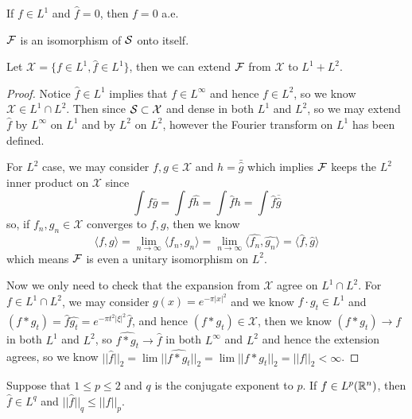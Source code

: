 \begin{corollary}
    If $f\in L^1$ and $\hat{f} = 0$, then $f=0$ a.e.
\end{corollary}

\begin{corollary}
    $\mathcal{F}$ is an isomorphism of $\mathcal{S}$ onto itself.
\end{corollary}

\begin{theorem}
    Let $\mathcal{X} = \{f\in L^1, \hat{f} \in L^1\}$, then we can extend $\mathcal{F}$ from $\mathcal{X}$ to $L^1 + L^2$.
\end{theorem}
\begin{proof}\par
    Notice $\hat{f}\in L^1$ implies that $f\in L^{\infty}$ and hence $f\in L^2$, so we know $\mathcal{X}\in L^1\cap L^2$. Then since $\mathcal{S} \subset \mathcal{X}$ and dense in both $L^1$ and $L^2$, so we may extend $\hat{f}$ by $L^{\infty}$ on $L^1$ and by $L^2$ on $L^2$, however the Fourier transform on $L^1$ has been defined.\par
    For $L^2$ case, we may consider $f,g\in\mathcal{X}$ and $h = \bar{\hat{g}}$ which implies $\mathcal{F}$ keeps the $L^2$ inner product on $\mathcal{X}$ since
    \[
    \int f\bar{g} = \int f\hat{h} = \int \hat{f}h = \int \hat{f}\overline{\hat{g}}
    \]
    so, if $f_n,g_n \in \mathcal{X}$ converges to $f,g$, then we know
    \[
    \langle f,g\rangle = \lim_{n\to\infty} \langle f_n,g_n\rangle = \lim_{n\to\infty}\langle \hat{f_n},\hat{g_n}\rangle = \langle \hat{f},\hat{g}\rangle
    \]
    which means $\mathcal{F}$ is even a unitary isomorphism on $L^2$.\par
    Now we only need to check that the expansion from $\mathcal{X}$ agree on $L^1\cap L^2$. For $f\in L^1 \cap L^2$, we may consider $g(x) = e^{-\pi|x|^2}$ and we know $f\cdot g_t \in L^1$ and $\hat{(f*g_t)} = \hat{f}\hat{g_t} = e^{-\pi t^2|\xi|^2}\hat{f}$, and hence $(f*g_t) \in \mathcal{X}$, then we know $(f*g_t) \to f$ in both $L^1$ and $L^2$, so $\hat{f*g_t} \to \hat{f}$ in both $L^{\infty}$ and $L^2$ and hence the extension agrees, so we know $||\hat{f}||_2 = \lim||\hat{f*g_t}||_2 = \lim||f*g_t||_2 = ||f||_2 < \infty$.
\end{proof}

\begin{theorem}
    Suppose that $1\leq p\leq 2$ and $q$ is the conjugate exponent to $p$. If $f\in L^p(\mathbb{R}^n)$, then $\hat{f}\in L^q$ and $||\hat{f}||_q \leq ||f||_p$.
\end{theorem}

